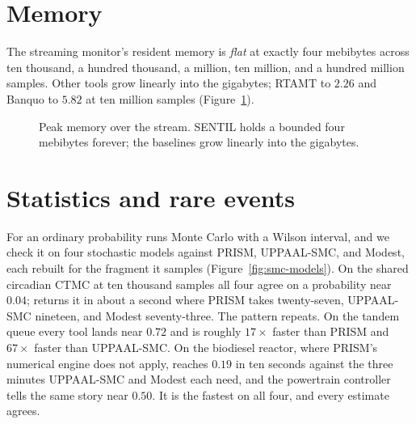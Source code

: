 \section{Memory}

The streaming monitor's resident memory is \emph{flat} at exactly four mebibytes across ten thousand, a hundred thousand, a million, ten million, and a hundred million samples. Other tools grow linearly into the gigabytes; RTAMT to $2.26$ and Banquo to $5.82$ at ten million samples (Figure~\ref{fig:memory}).

\begin{figure}[h]
\centering
\begin{widefig}\end{widefig}
\caption{Peak memory over the stream. SENTIL holds a bounded four mebibytes forever; the baselines grow linearly into the gigabytes.}
\label{fig:memory}
\end{figure}

\section{Statistics and rare events}

For an ordinary probability \sentil{} runs Monte Carlo with a Wilson interval, and we check it on four stochastic models against PRISM, UPPAAL-SMC, and Modest, each rebuilt for the fragment it samples (Figure~\ref{fig:smc-models}). On the shared circadian CTMC at ten thousand samples all four agree on a probability near $0.04$; \sentil{} returns it in about a second where PRISM takes twenty-seven, UPPAAL-SMC nineteen, and Modest seventy-three. The pattern repeats. On the tandem queue every tool lands near $0.72$ and \sentil{} is roughly $17\times$ faster than PRISM and $67\times$ faster than UPPAAL-SMC. On the biodiesel reactor, where PRISM's numerical engine does not apply, \sentil{} reaches $0.19$ in ten seconds against the three minutes UPPAAL-SMC and Modest each need, and the powertrain controller tells the same story near $0.50$. It is the fastest on all four, and every estimate agrees.

